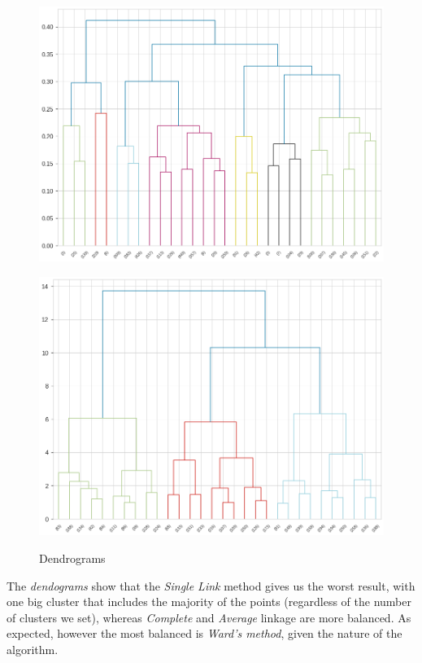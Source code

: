 \documentclass[a4paper,11pt,dvipsnames]{article}
\begin{document}
\begin{figure}[h!]
\begin{minipage}[b]{.25\linewidth}
    \includegraphics[width=\textwidth]{Graphs/h_average.png}\label{fig:avg_dend}
    \end{minipage}\hfill
    \begin{minipage}[b]{.25\linewidth}
    \centering
    \includegraphics[width=\textwidth]{Graphs/h_ward.png}\label{fig:Ward_dend}
    \end{minipage}\hfill
    \caption{Dendrograms} \label{fig:dends}
\end{figure}


The \textit{dendograms} show that the \textit{Single Link} method gives us the worst result, with one big cluster that includes the majority of the points (regardless of the number of clusters we set), whereas \textit{Complete} and \textit{Average} linkage are more balanced. As expected, however the most balanced is \textit{Ward's method}, given the nature of the algorithm. 
 
\end{document}
